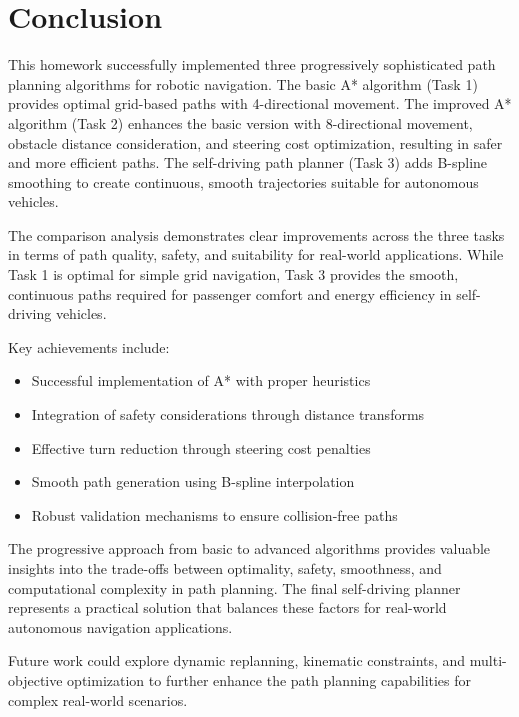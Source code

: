 \documentclass[aps,letterpaper,10pt]{revtex4}
\begin{document}
\section{Conclusion}

This homework successfully implemented three progressively sophisticated path planning algorithms for robotic navigation. The basic A* algorithm (Task 1) provides optimal grid-based paths with 4-directional movement. The improved A* algorithm (Task 2) enhances the basic version with 8-directional movement, obstacle distance consideration, and steering cost optimization, resulting in safer and more efficient paths. The self-driving path planner (Task 3) adds B-spline smoothing to create continuous, smooth trajectories suitable for autonomous vehicles.

The comparison analysis demonstrates clear improvements across the three tasks in terms of path quality, safety, and suitability for real-world applications. While Task 1 is optimal for simple grid navigation, Task 3 provides the smooth, continuous paths required for passenger comfort and energy efficiency in self-driving vehicles.

Key achievements include:
\begin{itemize}
    \item Successful implementation of A* with proper heuristics
    \item Integration of safety considerations through distance transforms
    \item Effective turn reduction through steering cost penalties
    \item Smooth path generation using B-spline interpolation
    \item Robust validation mechanisms to ensure collision-free paths
\end{itemize}

The progressive approach from basic to advanced algorithms provides valuable insights into the trade-offs between optimality, safety, smoothness, and computational complexity in path planning. The final self-driving planner represents a practical solution that balances these factors for real-world autonomous navigation applications.

Future work could explore dynamic replanning, kinematic constraints, and multi-objective optimization to further enhance the path planning capabilities for complex real-world scenarios.
\end{document}
